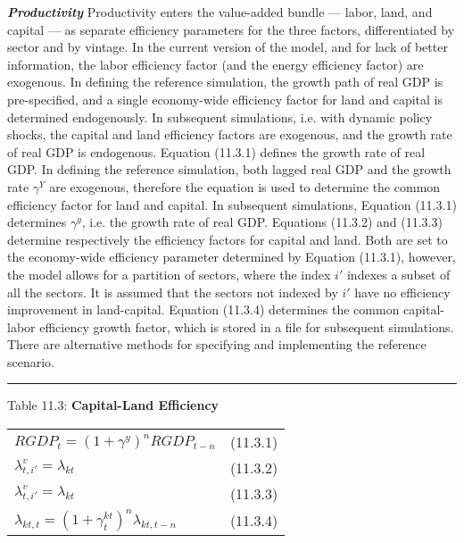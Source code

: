 \documentclass[12pt]{article}
\begin{document}
\textbf{\textit{Productivity}}
Productivity enters the value-added bundle — labor, land, and capital — as separate efficiency parameters for the three factors, differentiated by sector and by vintage. In the current version of the model, and for lack of better information, the labor efficiency factor (and the energy efficiency factor) are exogenous. In defining the reference simulation, the growth path of real GDP is pre-specified, and a single economy-wide efficiency factor for land and capital is determined endogenously. In subsequent simulations, i.e. with dynamic policy shocks, the capital and land efficiency factors are exogenous, and the growth rate of real GDP is endogenous.
Equation (11.3.1) defines the growth rate of real GDP. In defining the reference simulation, both lagged real GDP and the growth rate $\gamma^Y$ are exogenous, therefore the equation is used to determine the common efficiency factor for land and capital. In subsequent simulations, Equation (11.3.1) determines $\gamma^y$, i.e. the growth rate of real GDP. Equations (11.3.2) and (11.3.3) determine respectively the efficiency factors for capital and land. Both are set to the economy-wide efficiency parameter determined by Equation (11.3.1), however, the model allows for a partition of sectors, where the index $i'$ indexes a subset of all the sectors. It is assumed that the sectors not indexed by $i'$ have no efficiency improvement in land-capital. Equation (11.3.4) determines the common capital-labor efficiency growth factor, which is stored in a file for subsequent simulations. There are alternative methods for specifying and implementing the reference scenario.


\noindent\rule{\linewidth}{0.4pt}
\begin{center}
\begin{large}
{\centering Table 11.3: \textbf{Capital-Land Efficiency} \par}

\begin{tabular}{>{\raggedright}p{} l}


$RGDP_t = (1 + \gamma^y)^n RGDP_{t-n}$ & (11.3.1) \\[15pt]

$\lambda^v_{t,i'} = \lambda_{kt}$ & (11.3.2) \\[15pt]

$\lambda^v_{t,i'} = \lambda_{kt}$ & (11.3.3) \\[15pt]

$\lambda_{kt,t} = (1 + \gamma^{kt}_t)^n \lambda_{kt, t-n}$ & (11.3.4)\\[20pt]

\hline
\end{tabular}
\end{large}
\end{center}
\end{document}
